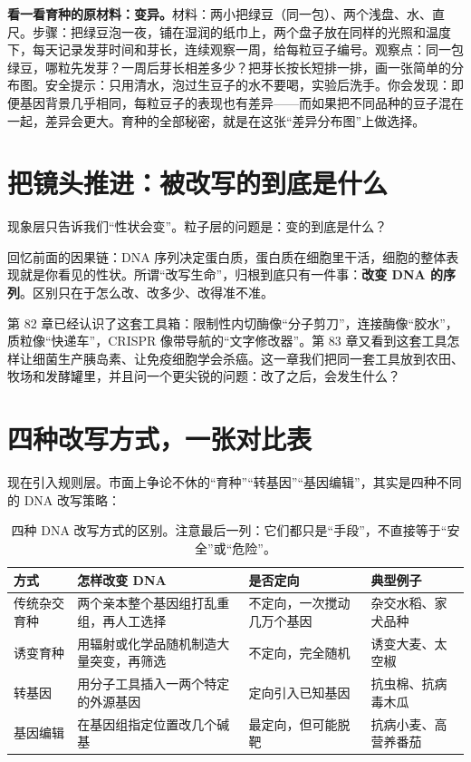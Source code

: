 \begin{shiyan}
\textbf{看一看育种的原材料：变异。}材料：两小把绿豆（同一包）、两个浅盘、水、直尺。步骤：把绿豆泡一夜，铺在湿润的纸巾上，两个盘子放在同样的光照和温度下，每天记录发芽时间和芽长，连续观察一周，给每粒豆子编号。观察点：同一包绿豆，哪粒先发芽？一周后芽长相差多少？把芽长按长短排一排，画一张简单的分布图。安全提示：只用清水，泡过生豆子的水不要喝，实验后洗手。你会发现：即便基因背景几乎相同，每粒豆子的表现也有差异——而如果把不同品种的豆子混在一起，差异会更大。育种的全部秘密，就是在这张“差异分布图”上做选择。
\end{shiyan}

\section{把镜头推进：被改写的到底是什么}

现象层只告诉我们“性状会变”。粒子层的问题是：变的到底是什么？

回忆前面的因果链：DNA 序列决定蛋白质，蛋白质在细胞里干活，细胞的整体表现就是你看见的性状。所谓“改写生命”，归根到底只有一件事：\textbf{改变 DNA 的序列}。区别只在于怎么改、改多少、改得准不准。

第 82 章已经认识了这套工具箱：限制性内切酶像“分子剪刀”，连接酶像“胶水”，质粒像“快递车”，CRISPR 像带导航的“文字修改器”。第 83 章又看到这套工具怎样让细菌生产胰岛素、让免疫细胞学会杀癌。这一章我们把同一套工具放到农田、牧场和发酵罐里，并且问一个更尖锐的问题：改了之后，会发生什么？

\section{四种改写方式，一张对比表}

现在引入规则层。市面上争论不休的“育种”“转基因”“基因编辑”，其实是四种不同的 DNA 改写策略：

\begin{table}[htbp]
\centering
\small
\begin{tabular}{@{}p{2.6cm}p{4.6cm}p{2.6cm}p{3.2cm}@{}}
\toprule
方式 & 怎样改变 DNA & 是否定向 & 典型例子 \\
\midrule
传统杂交育种 & 两个亲本整个基因组打乱重组，再人工选择 & 不定向，一次搅动几万个基因 & 杂交水稻、家犬品种 \\
诱变育种 & 用辐射或化学品随机制造大量突变，再筛选 & 不定向，完全随机 & 诱变大麦、太空椒 \\
转基因 & 用分子工具插入一两个特定的外源基因 & 定向引入已知基因 & 抗虫棉、抗病毒木瓜 \\
基因编辑 & 在基因组指定位置改几个碱基 & 最定向，但可能脱靶 & 抗病小麦、高营养番茄 \\
\bottomrule
\end{tabular}
\caption{四种 DNA 改写方式的区别。注意最后一列：它们都只是“手段”，不直接等于“安全”或“危险”。}
\end{table}

